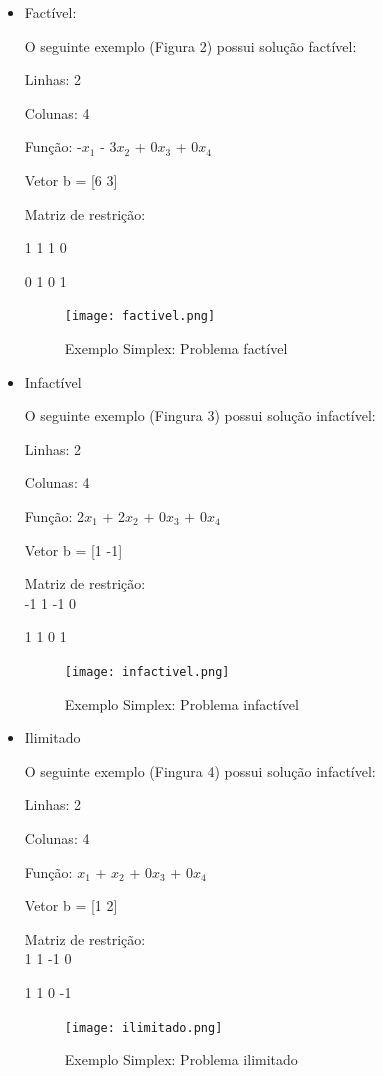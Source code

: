 \documentclass[a4paper]{article}
\begin{document}
\begin{itemize}
\item Fact\'ivel:

O seguinte exemplo (Figura 2) possui solu\c{c}\~ao fact\'ivel:

Linhas: 2

Colunas: 4

Fun\c{c}\~ao: -$x_1$ - 3$x_2$ + 0$x_3$ + 0$x_4$

Vetor b = [6 3]

Matriz de restri\c{c}\~ao:

1 1 1 0

0 1 0 1

\begin{figure}[h!]
\caption{Exemplo Simplex: Problema fact\'ivel}
\texttt{[image: factivel.png]}
\end{figure}

\item Infact\'ivel

O seguinte exemplo (Fingura 3) possui solu\c{c}\~ao infact\'ivel:

Linhas: 2

Colunas: 4

Fun\c{c}\~ao: 2$x_1$ + 2$x_2$ + 0$x_3$ + 0$x_4$

Vetor b = [1 -1]

Matriz de restri\c{c}\~ao:\\
-1 1 -1 0

1 1 0 1

\begin{figure}[h!]
\caption{Exemplo Simplex: Problema infact\'ivel}
\texttt{[image: infactivel.png]}
\end{figure}
\item Ilimitado

O seguinte exemplo (Fingura 4) possui solu\c{c}\~ao infact\'ivel:

Linhas: 2

Colunas: 4

Fun\c{c}\~ao: $x_1$ + $x_2$ + 0$x_3$ + 0$x_4$

Vetor b = [1 2]

Matriz de restri\c{c}\~ao:\\
1 1 -1 0

1 1 0 -1

\begin{figure}[h!]
\caption{Exemplo Simplex: Problema ilimitado}
\texttt{[image: ilimitado.png]}
\end{figure}

\end{itemize}
\end{document}
